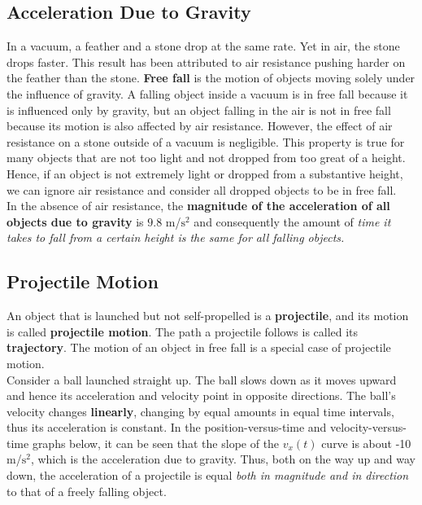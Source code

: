     \subsection{Acceleration Due to Gravity}
        In a vacuum, a feather and a stone drop at the same rate. Yet in air, the stone drops faster. This result has been attributed to air resistance pushing harder on the feather than the stone. \textbf{Free fall} is
        the motion of objects moving solely under the influence of gravity. A falling object inside a vacuum is in free fall because it is influenced only by gravity, but an object falling in the air is not in free fall
        because its motion is also affected by air resistance. However, the effect of air resistance on a stone outside of a vacuum is negligible. This property is true for many objects that are not too light and not
        dropped from too great of a height. Hence, if an object is not extremely light or dropped from a substantive height, we can ignore air resistance and consider all dropped objects to be in free fall. \\

        In the absence of air resistance, the \textbf{magnitude of the acceleration of all objects due to gravity} is $\bm{9.8}$ m/$\text{s}^2$ and consequently the amount of \textit{time it takes to fall from a certain height
        is the same for all falling objects.}



    \subsection{Projectile Motion}
        An object that is launched but not self-propelled is a \textbf{projectile}, and its motion is called \textbf{projectile motion}. The path a projectile follows is called its \textbf{trajectory}. The motion of an
        object in free fall is a special case of projectile motion. \\

        Consider a ball launched straight up. The ball slows down as it moves upward and hence its acceleration and velocity point in opposite directions. The ball's velocity changes \textbf{linearly}, changing by
        equal amounts in equal time intervals, thus its acceleration is constant. In the position-versus-time and velocity-versus-time graphs below, it can be seen that the slope of the $v_x (t)$ curve is about
        -10 m/$\text{s}^2$, which is the acceleration due to gravity. Thus, both on the way up and way down, the acceleration of a projectile is equal \textit{both in magnitude and in direction} to that of a freely falling
        object.

